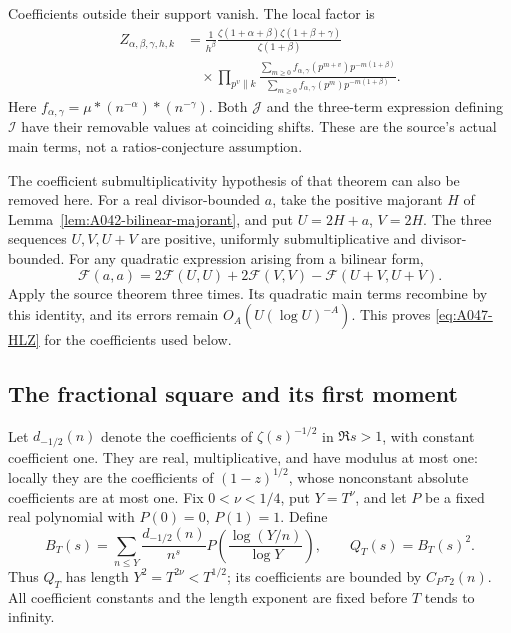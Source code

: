 Coefficients outside their support vanish.  The local factor is
\begin{equation}\label{eq:A047-Z}
\begin{aligned}
 Z_{\alpha,\beta,\gamma,h,k}
 &=\frac1{h^\beta}
  \frac{\zeta(1+\alpha+\beta)\zeta(1+\beta+\gamma)}
       {\zeta(1+\beta)}\\
 &\quad{}\times\prod_{p^v\parallel k}
 \frac{\sum_{m\ge0} f_{\alpha,\gamma}(p^{m+v})
                                  p^{-m(1+\beta)}}
      {\sum_{m\ge0} f_{\alpha,\gamma}(p^m)
                                  p^{-m(1+\beta)}} .
\end{aligned}
\end{equation}
Here \(f_{\alpha,\gamma}=\mu*(n^{-\alpha})*(n^{-\gamma})\).
Both \(\mathcal J\) and the three-term expression defining
\(\mathcal I\) have their removable values at coinciding shifts.
These are the source's actual main terms, not a ratios-conjecture
assumption.

The coefficient submultiplicativity hypothesis of that theorem
can also be removed here.  For a real divisor-bounded \(a\), take
the positive majorant \(H\) of
Lemma~\ref{lem:A042-bilinear-majorant}, and put \(U=2H+a\),
\(V=2H\).  The three sequences \(U,V,U+V\) are positive,
uniformly submultiplicative and divisor-bounded.  For any
quadratic expression arising from a bilinear form,
\[
             \mathcal F(a,a)=
          2\mathcal F(U,U)+2\mathcal F(V,V)
                                  -\mathcal F(U+V,U+V).
\]
Apply the source theorem three times.  Its quadratic main
terms recombine by this identity, and its errors remain
\(O_A(U(\log U)^{-A})\).  This proves
\eqref{eq:A047-HLZ} for the coefficients used below.

\subsection*{The fractional square and its first moment}

Let \(d_{-1/2}(n)\) denote the coefficients of
\(\zeta(s)^{-1/2}\) in \(\Re s>1\), with constant coefficient
one.  They are real, multiplicative, and have modulus at most
one: locally they are the coefficients of \((1-z)^{1/2}\),
whose nonconstant absolute coefficients are at most one.
Fix \(0<\nu<1/4\), put \(Y=T^\nu\), and let \(P\) be a fixed
real polynomial with \(P(0)=0\), \(P(1)=1\).  Define
\begin{equation}\label{eq:A047-mollifier}
 B_T(s)=\sum_{n\le Y}\frac{d_{-1/2}(n)}{n^s}
               P\left(\frac{\log(Y/n)}{\log Y}\right),
 \qquad Q_T(s)=B_T(s)^2.
\end{equation}
Thus \(Q_T\) has length \(Y^2=T^{2\nu}<T^{1/2}\);
its coefficients are bounded by \(C_P\tau_2(n)\).
All coefficient constants and the length exponent are fixed
before \(T\) tends to infinity.

